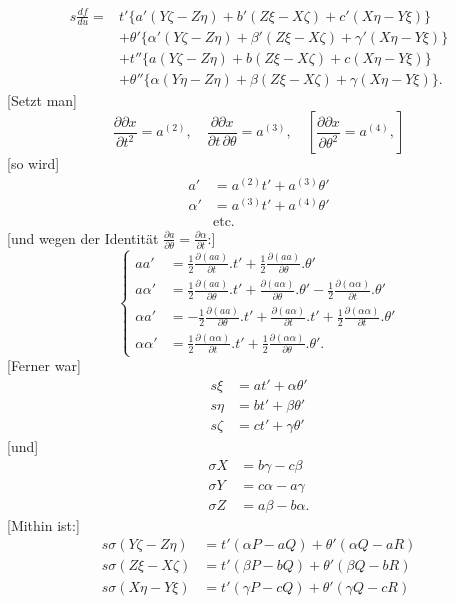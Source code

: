 %
\[
\begin{aligned}
s\frac{df}{du}={}&t'\{a'(Y\zeta-Z\eta)+b'(Z\xi-X\zeta)+c'(X\eta-Y\xi)\}\\
&+\theta'\{\alpha'(Y\zeta-Z\eta)+\beta'(Z\xi-X\zeta)+\gamma'(X\eta-Y\xi)\}\\
&+t''\{a(Y\zeta-Z\eta)+b(Z\xi-X\zeta)+c(X\eta-Y\xi)\}\\
&+\theta''\{\alpha(Y\eta-Z\eta)+\beta(Z\xi-X\zeta)+\gamma(X\eta-Y\xi)\}.
\end{aligned}
\]
[Setzt man]
\[
\frac{\partial\partial x}{\partial t^2}=a^{(2)},\quad
\frac{\partial\partial x}{\partial t\,\partial\theta}=a^{(3)},\quad
\left[\frac{\partial\partial x}{\partial\theta^2}=a^{(4)},\right]
\]
[so wird]
\[
\begin{aligned}
a'&=a^{(2)}t'+a^{(3)}\theta'\\
\alpha'&=a^{(3)}t'+a^{(4)}\theta'\\
&\text{etc.}
\end{aligned}
\]
[und wegen der Identität $\frac{\partial a}{\partial\theta}=\frac{\partial\alpha}{\partial t}$:]
\begin{equation}\tag*{[15]}
\left\{\begin{aligned}
aa'&=\tfrac12\frac{\partial(aa)}{\partial t}.t'+\tfrac12\frac{\partial(aa)}{\partial\theta}.\theta'\\
a\alpha'&=\tfrac12\frac{\partial(aa)}{\partial\theta}.t'+\frac{\partial(a\alpha)}{\partial\theta}.\theta'-\tfrac12\frac{\partial(\alpha\alpha)}{\partial t}.\theta'\\
\alpha a'&=-\tfrac12\frac{\partial(aa)}{\partial\theta}.t'+\frac{\partial(a\alpha)}{\partial t}.t'+\tfrac12\frac{\partial(\alpha\alpha)}{\partial t}.\theta'\\
\alpha\alpha'&=\tfrac12\frac{\partial(\alpha\alpha)}{\partial t}.t'+\tfrac12\frac{\partial(\alpha\alpha)}{\partial\theta}.\theta'.
\end{aligned}\right.
\end{equation}
[Ferner war]
\[
\begin{aligned}s\xi&=at'+\alpha\theta'\\s\eta&=bt'+\beta\theta'\\s\zeta&=ct'+\gamma\theta'\end{aligned}
\]
[und]
\[
\begin{aligned}
\sigma X&=b\gamma-c\beta\\
\sigma Y&=c\alpha-a\gamma\\
\sigma Z&=a\beta-b\alpha.
\end{aligned}
\]
[Mithin ist:]
\[
\begin{aligned}
s\sigma(Y\zeta-Z\eta)&=t'(\alpha P-aQ)+\theta'(\alpha Q-aR)\\
s\sigma(Z\xi-X\zeta)&=t'(\beta P-bQ)+\theta'(\beta Q-bR)\\
s\sigma(X\eta-Y\xi)&=t'(\gamma P-cQ)+\theta'(\gamma Q-cR)
\end{aligned}
\]

